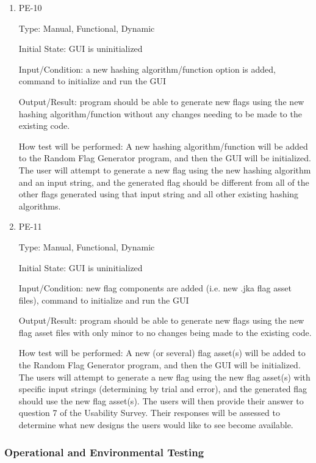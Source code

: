 \documentclass[12pt, titlepage]{article}
\begin{document}
\begin{enumerate}

\item{PE-10\\}

Type: Manual, Functional, Dynamic

Initial State: GUI is uninitialized

Input/Condition: a new hashing algorithm/function option is added, command to
initialize and run the GUI

Output/Result: program should be able to generate new flags using the new
hashing algorithm/function without any changes needing to be made to the
existing code.

How test will be performed: A new hashing algorithm/function will be added to
the Random Flag Generator program, and then the GUI will be initialized. The
user will attempt to generate a new flag using the new hashing algorithm and
an input string, and the generated flag should be different from all of the
other flags generated using that input string and all other existing hashing
algorithms.

\item{PE-11\\}

Type: Manual, Functional, Dynamic

Initial State: GUI is uninitialized

Input/Condition: new flag components are added (i.e. new .jka flag asset
files), command to initialize and run the GUI

Output/Result: program should be able to generate new flags using the new flag
asset files with only minor to no changes being made to the existing code.

How test will be performed: A new (or several) flag asset(s) will be added to
the Random Flag Generator program, and then the GUI will be initialized. The
users will attempt to generate a new flag using the new flag asset(s) with
specific input strings (determining by trial and error), and the generated
flag should use the new flag asset(s). The users will then provide their
answer to question 7 of the Usability Survey. Their responses will be assessed
to determine what new designs the users would like to see become available.

\end{enumerate}

\subsubsection{Operational and Environmental Testing}
\end{document}
